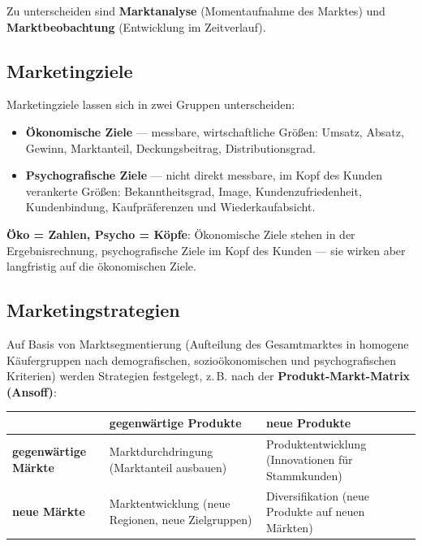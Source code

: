 \documentclass[11pt, a4paper]{article}
\begin{document}
Zu unterscheiden sind \textbf{Marktanalyse} (Momentaufnahme des Marktes) und
\textbf{Marktbeobachtung} (Entwicklung im Zeitverlauf).

\subsection{Marketingziele}

Marketingziele lassen sich in zwei Gruppen unterscheiden:

\begin{itemize}
  \item \textbf{Ökonomische Ziele} --- messbare, wirtschaftliche Größen: Umsatz, Absatz,
    Gewinn, Marktanteil, Deckungsbeitrag, Distributionsgrad.
  \item \textbf{Psychografische Ziele} --- nicht direkt messbare, im Kopf des Kunden
    verankerte Größen: Bekanntheitsgrad, Image, Kundenzufriedenheit, Kundenbindung,
    Kaufpräferenzen und Wiederkaufabsicht.
\end{itemize}

\begin{eselsbruecke}
\textbf{Öko = Zahlen, Psycho = Köpfe}: Ökonomische Ziele stehen in der
Ergebnisrechnung, psychografische Ziele im Kopf des Kunden --- sie wirken aber
langfristig auf die ökonomischen Ziele.
\end{eselsbruecke}

\subsection{Marketingstrategien}

Auf Basis von Marktsegmentierung (Aufteilung des Gesamtmarktes in homogene
Käufergruppen nach demografischen, sozioökonomischen und psychografischen Kriterien)
werden Strategien festgelegt, z.\,B. nach der \textbf{Produkt-Markt-Matrix (Ansoff)}:

\begin{center}
\begin{tabular}{p{3.4cm} p{5.2cm} p{5.2cm}}
 & \textbf{gegenwärtige Produkte} & \textbf{neue Produkte}\\
\hline
\textbf{gegenwärtige Märkte} & Marktdurchdringung (Marktanteil ausbauen) & Produktentwicklung (Innovationen für Stammkunden)\\
\textbf{neue Märkte} & Marktentwicklung (neue Regionen, neue Zielgruppen) & Diversifikation (neue Produkte auf neuen Märkten)\\
\end{tabular}
\end{center}
\end{document}
